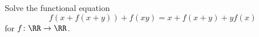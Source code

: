 Solve the functional equation
\[ f(x+f(x+y)) + f(xy) = x + f(x+y) + yf(x) \]
for $f \colon \RR \to \RR$.